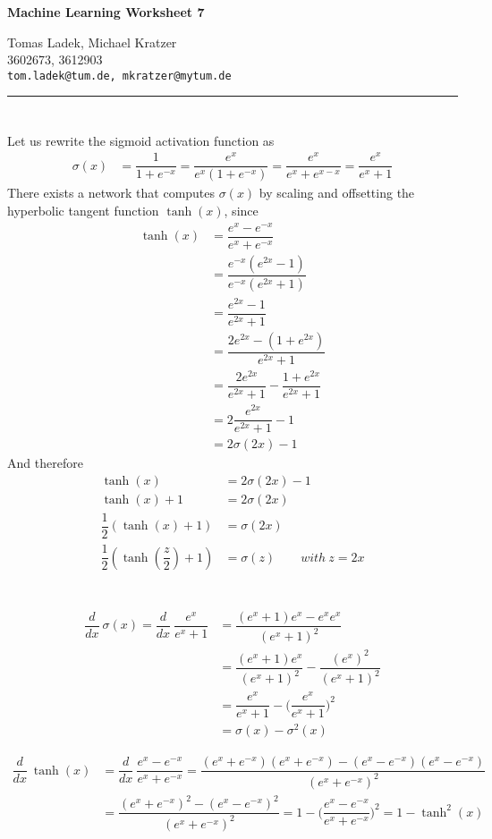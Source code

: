 \documentclass[11pt]{article}
\makeatletter
\newcommand{\exercise}{\section{}}
\newcommand{\hwhead}[4]{
\begin{center}
\sffamily\large\bfseries Machine Learning Worksheet #1
\vspace{2mm}
\normalfont

#2\\
#3\\
\texttt{#4}
\end{center}
\vspace{6mm} \hrule \vspace{4mm}
}
\newcommand{\names}{Tomas Ladek, Michael Kratzer} %
\newcommand{\imats}{3602673, 3612903} %
\newcommand{\emails}{tom.ladek@tum.de, mkratzer@mytum.de} %
\makeatother
\begin{document}
\hwhead{7}{\names}{\imats}{\emails}


\exercise
Let us rewrite the sigmoid activation function as
\begin{align*}
	\sigma(x) &= \dfrac{1}{1 + e^{-x}} = \dfrac{e^x}{e^x (1 + e^{-x})} = \dfrac{e^x}{e^x + e^{x-x}} = \dfrac{e^x}{e^x + 1}
\end{align*}
There exists a network that computes $\sigma(x)$ by scaling and offsetting the hyperbolic tangent function $\tanh(x)$, since
\begin{align*}
	\tanh(x) &= \dfrac{e^x - e^{-x}}{e^x + e^{-x}} \\
	&= \dfrac{e^{-x} (e^{2x} - 1)}{e^{-x} (e^{2x} + 1)} \\
	&= \dfrac{e^{2x} - 1}{e^{2x} + 1} \\
	&= \dfrac{2e^{2x} - (1 + e^{2x})}{e^{2x} + 1} \\
	&= \dfrac{2e^{2x}}{e^{2x} + 1} - \dfrac{1 + e^{2x}}{e^{2x} + 1}\\
	&= 2 \dfrac{e^{2x}}{e^{2x} + 1} - 1\\
	&= 2 \sigma(2x) - 1
\end{align*}
And therefore
\begin{align*}
	\tanh(x) &= 2 \sigma(2x) - 1\\
	\tanh(x) + 1 &= 2 \sigma(2x)\\
	\dfrac{1}{2} (\tanh(x) + 1) &= \sigma(2x)\\
	\dfrac{1}{2} (\tanh(\dfrac{z}{2}) + 1) &= \sigma(z) \quad\quad with\ z = 2x	
\end{align*}

\exercise
\begin{align*}
	\dfrac{d}{dx}\ \sigma(x) = \dfrac{d}{dx}\ \dfrac{e^x}{e^x + 1} &= \dfrac{(e^x + 1) e^x - e^x e^x}{(e^x + 1)^2}\\
	&= \dfrac{(e^{x} + 1)e^x}{(e^x + 1)^2} - \dfrac{(e^{x})^2}{(e^x + 1)^2}\\
	&= \dfrac{e^x}{e^x + 1} - \Big(\dfrac{e^x}{e^x + 1}\Big)^2\\
	&= \sigma(x) - \sigma^2(x)
\end{align*}

\begin{align*}
	\dfrac{d}{dx}\ \tanh(x) &= \dfrac{d}{dx}\ \dfrac{e^x - e^{-x}}{e^x + e^{-x}} 
	= \dfrac{(e^x + e^{-x})(e^x + e^{-x}) - (e^x - e^{-x})(e^x - e^{-x})}{(e^x + e^{-x})^2}\\
	&= \dfrac{(e^x + e^{-x})^2 - (e^x - e^{-x})^2}{(e^x + e^{-x})^2} = 1 - \Big(\dfrac{e^x - e^{-x}}{e^x + e^{-x}}\Big)^2 = 1 - \tanh^2(x)
\end{align*}
\end{document}
